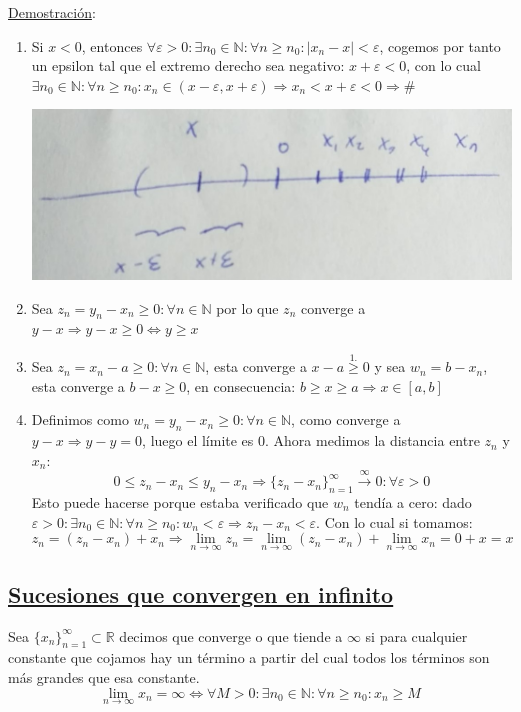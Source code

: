 \documentclass[10pt,a4paper,openright]{book}
\begin{document}
\underline{Demostración}:
\begin{enumerate}
\item Si $x<0$, entonces $\forall \varepsilon >0: \exists n_0\in \mathbb N: \forall n\geq n_0: |x_n-x|<\varepsilon$, cogemos por tanto un epsilon tal que el extremo derecho sea negativo: $x+\varepsilon<0$, con lo cual $\exists n_0\in \mathbb N: \forall n \geq n_0: x_n\in (x-\varepsilon,x+\varepsilon)\Rightarrow x_n<x+\varepsilon<0\Rightarrow \#$

\begin{center}
\includegraphics[scale=0.25]{limite negativo}
\end{center}

\item Sea $z_n=y_n-x_n\geq 0: \forall n\in \mathbb N$ por lo que $z_n$ converge a $y-x\Rightarrow y-x\geq 0\Leftrightarrow y\geq x$

\item Sea $z_n=x_n-a\geq 0: \forall n \in \mathbb N$, esta converge a $x-a\stackrel{1.}{\geq}0$ y sea $w_n=b-x_n$, esta converge a $b-x\geq 0$, en consecuencia: $b\geq x\geq a\Rightarrow x\in [a,b]$

\item Definimos como $w_n=y_n-x_n\geq 0: \forall n \in \mathbb N$, como converge a $y-x\Rightarrow y-y=0$, luego el límite es 0. Ahora medimos la distancia entre $z_n$ y $x_n$:
$$0\leq z_n-x_n\leq y_n-x_n\Rightarrow \{z_n-x_n\}_{n=1}^\infty\stackrel{\infty}{\rightarrow} 0: \forall \varepsilon>0$$
Esto puede hacerse porque estaba verificado que $w_n$ tendía a cero: dado $\varepsilon>0: \exists n_0\in \mathbb N: \forall n\geq n_0: w_n<\varepsilon\Rightarrow z_n-x_n<\varepsilon$. Con lo cual si tomamos:
$$z_n=(z_n-x_n)+x_n\Rightarrow \lim_{n\rightarrow \infty} z_n=\lim_{n\rightarrow \infty} (z_n-x_n)+ \lim_{n\rightarrow \infty} x_n=0+x=x$$
\end{enumerate}

\subsection*{\underline{Sucesiones que convergen en infinito}}
Sea $\{x_n\}_{n=1}^\infty\subset \mathbb R$ decimos que converge o que tiende a $\infty$ si para cualquier constante que cojamos hay un término a partir del cual todos los términos son más grandes que esa constante.
$$\lim_{n\rightarrow \infty} x_n=\infty \Leftrightarrow \forall M>0: \exists n_0\in \mathbb N: \forall n \geq n_0: x_n\geq M$$
\end{document}
